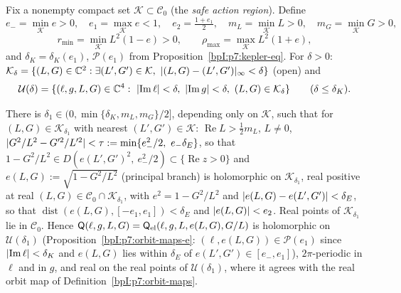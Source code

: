 Fix a nonempty compact set $\mathcal K\subset\mathcal C_0$ (the \emph{safe action region}). Define
\[
e_-=\min_{\mathcal K}e>0,\quad e_1=\max_{\mathcal K}e<1,\quad e_2=\tfrac{1+e_1}2,\quad m_L=\min_{\mathcal K}L>0,\quad m_G=\min_{\mathcal K}G>0,
\]
\[
r_{\min}=\min_{\mathcal K}L^2(1-e)>0,\qquad\rho_{\max}=\max_{\mathcal K}L^2(1+e),
\]
and $\delta_K=\delta_K(e_1)$, $\mathcal P(e_1)$ from Proposition~\ref{bpI:p7:kepler-eq}. For $\delta>0$: $\mathcal K_\delta=\{(L,G)\in\C^2:\exists(L',G')\in\mathcal K,\ \abs{(L,G)-(L',G')}_\infty<\delta\}$ (open) and
\[
\mathcal U(\delta)=\{(\ell,g,L,G)\in\C^4:\ \abs{\operatorname{Im}\ell}<\delta,\ \abs{\operatorname{Im}g}<\delta,\ (L,G)\in\mathcal K_\delta\}\qquad(\delta\le\delta_K).
\]

\begin{lemma}\label{bpI:p7:complex-domain}
There is $\delta_1\in(0,\min\{\delta_K,m_L,m_G\}/2]$, depending only on $\mathcal K$, such that for $(L,G)\in\mathcal K_{\delta_1}$ with nearest $(L',G')\in\mathcal K$:
$\operatorname{Re}L>\tfrac12m_L$, $L\ne0$, $\abs{G^2/L^2-G'^2/L'^2}<\tau:=\min\{e_-^2/2,\ e_-\delta_E\}$, so that $1-G^2/L^2\in D(e(L',G')^2,\ e_-^2/2)\subset\{\operatorname{Re}z>0\}$ and
$e(L,G):=\sqrt{1-G^2/L^2}$ (principal branch) is holomorphic on $\mathcal K_{\delta_1}$, real positive at real $(L,G)\in\mathcal C_0\cap\mathcal K_{\delta_1}$, with $e^2=1-G^2/L^2$ and $\lvert e(L,G)-e(L',G')\rvert<\delta_E$, so that $\operatorname{dist}(e(L,G),[-e_1,e_1])<\delta_E$ and $\lvert e(L,G)\rvert<e_2$. Real points of $\mathcal K_{\delta_1}$ lie in $\mathcal C_0$.
Hence $\mathsf Q(\ell,g,L,G)=\mathsf Q_{\rm el}(\ell,g,L,e(L,G),G/L)$ is holomorphic on $\mathcal U(\delta_1)$ (Proposition~\ref{bpI:p7:orbit-maps-e}: $(\ell,e(L,G))\in\mathcal P(e_1)$ since $\lvert \operatorname{Im}\ell\rvert<\delta_K$ and $e(L,G)$ lies within $\delta_E$ of $e(L',G')\in[e_-,e_1]$), $2\pi$-periodic in $\ell$ and in $g$, and real on the real points of $\mathcal U(\delta_1)$, where it agrees with the real orbit map of Definition~\ref{bpI:p7:orbit-maps}.
\end{lemma}
